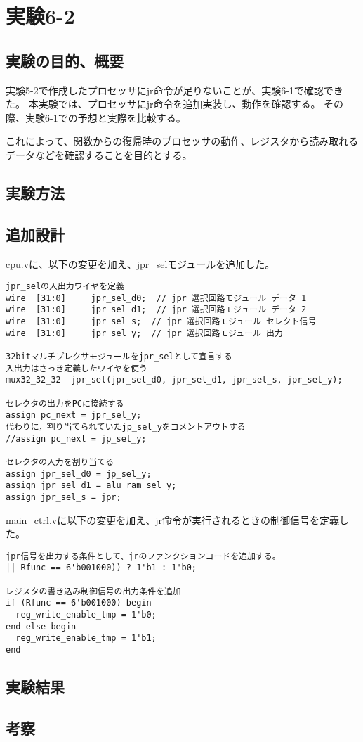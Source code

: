 \section{実験6-2}
\subsection{実験の目的、概要}
実験5-2で作成したプロセッサにjr命令が足りないことが、実験6-1で確認できた。
本実験では、プロセッサにjr命令を追加実装し、動作を確認する。
その際、実験6-1での予想と実際を比較する。

これによって、関数からの復帰時のプロセッサの動作、レジスタから読み取れるデータなどを確認することを目的とする。

\subsection{実験方法}

\subsection{追加設計}
cpu.vに、以下の変更を加え、jpr\_selモジュールを追加した。
\begin{lstlisting}[caption={cpu.vの追加設計},label={cpu.vの追加設計6-2}]
jpr_selの入出力ワイヤを定義
wire  [31:0]     jpr_sel_d0;  // jpr 選択回路モジュール データ 1
wire  [31:0]     jpr_sel_d1;  // jpr 選択回路モジュール データ 2
wire  [31:0]     jpr_sel_s;  // jpr 選択回路モジュール セレクト信号
wire  [31:0]     jpr_sel_y;  // jpr 選択回路モジュール 出力

32bitマルチプレクサモジュールをjpr_selとして宣言する
入出力はさっき定義したワイヤを使う
mux32_32_32  jpr_sel(jpr_sel_d0, jpr_sel_d1, jpr_sel_s, jpr_sel_y);

セレクタの出力をPCに接続する
assign pc_next = jpr_sel_y;
代わりに，割り当てられていたjp_sel_yをコメントアウトする
//assign pc_next = jp_sel_y;

セレクタの入力を割り当てる
assign jpr_sel_d0 = jp_sel_y;
assign jpr_sel_d1 = alu_ram_sel_y;
assign jpr_sel_s = jpr;
\end{lstlisting}

main\_ctrl.vに以下の変更を加え、jr命令が実行されるときの制御信号を定義した。
\begin{lstlisting}[caption={main\_ctrl.vの追加設計},label={mainctrl.vの追加設計6-2}]
jpr信号を出力する条件として、jrのファンクションコードを追加する。
|| Rfunc == 6'b001000)) ? 1'b1 : 1'b0;

レジスタの書き込み制御信号の出力条件を追加
if (Rfunc == 6'b001000) begin
  reg_write_enable_tmp = 1'b0;
end else begin
  reg_write_enable_tmp = 1'b1;
end
\end{lstlisting}

\subsection{実験結果}

\subsection{考察}
